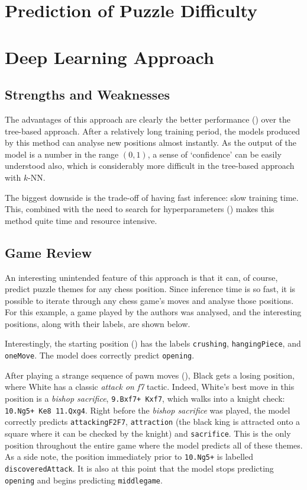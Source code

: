 \section{Prediction of Puzzle Difficulty}\label{evalS2}


\section{Deep Learning Approach}\label{evalS3}

\subsection{Strengths and Weaknesses}\label{evalS31}

The advantages of this approach are clearly the better performance
() over the tree-based approach. After a relatively long
training period, the models produced by this method can analyse new positions
almost instantly. As the output of the model is a number in the range $(0, 1)$,
a sense of `confidence' can be easily understood also, which is considerably
more difficult in the tree-based approach with $k$-NN.

The biggest downside is the trade-off of having fast inference: slow training
time. This, combined with the need to search for hyperparameters ()
makes this method quite time and resource intensive. 

\subsection{Game Review}\label{evalS32}

An interesting unintended feature of this approach is that it can, of course,
predict puzzle themes for any chess position. Since inference time is so fast,
it is possible to iterate through any chess game's moves and analyse those
positions. For this example, a game played by the authors was analysed, and the
interesting positions, along with their labels, are shown below.

Interestingly, the starting position () has the labels
\texttt{crushing}, \texttt{hangingPiece}, and \texttt{oneMove}. The model does
correctly predict \texttt{opening}. 

After playing a strange sequence of pawn moves (), Black gets a
losing position, where White has a classic \emph{attack on f7} tactic. Indeed,
White's best move in this position is a \emph{bishop sacrifice},
\texttt{9.Bxf7+ Kxf7}, which walks into a knight check: \texttt{10.Ng5+ Ke8
11.Qxg4}. Right before the \emph{bishop sacrifice} was played, the model
correctly predicts \texttt{attackingF2F7}, \texttt{attraction} (the black king
is attracted onto a square where it can be checked by the knight) and
\texttt{sacrifice}. This is the only position throughout the entire game where
the model predicts all of these themes. As a side note, the position
immediately prior to \texttt{10.Ng5+} is labelled \texttt{discoveredAttack}. It
is also at this point that the model stops predicting \texttt{opening} and
begins predicting \texttt{middlegame}.

